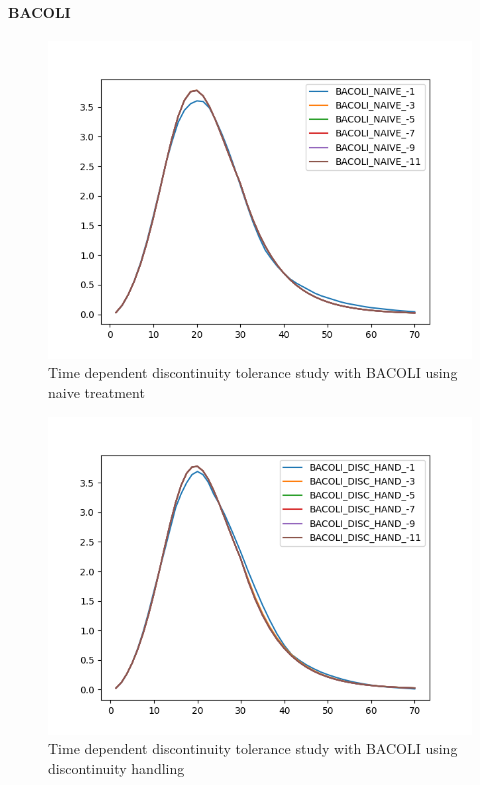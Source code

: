 \documentclass{article}
\begin{document}
\paragraph{BACOLI}

\begin{figure}[H]
\centering
\includegraphics[width=0.7\linewidth]{./figures/pde_time_disc_bacoli_naive_tol}
\caption{Time dependent discontinuity tolerance study with BACOLI using naive treatment}
\label{fig:pde_time_disc_bacoli_naive_tol}
\end{figure}

\begin{figure}[H]
\centering
\includegraphics[width=0.7\linewidth]{./figures/pde_time_disc_bacoli_disc_hand_tol}
\caption{Time dependent discontinuity tolerance study with BACOLI using discontinuity handling}
\label{fig:pde_time_disc_bacoli_disc_hand_tol}
\end{figure}
\end{document}
